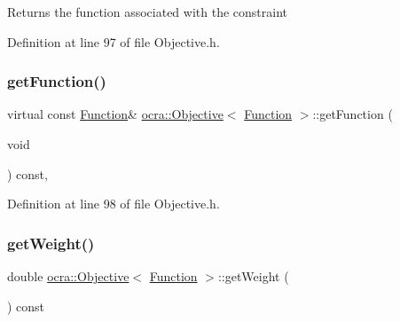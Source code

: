 Returns the function associated with the constraint 

Definition at line 97 of file Objective.\+h.

\hypertarget{classocra_1_1Objective_3_01Function_01_4_a95077951a77304a73e345eb093513da0}{}\label{classocra_1_1Objective_3_01Function_01_4_a95077951a77304a73e345eb093513da0} 
\subsubsection{\texorpdfstring{get\+Function()}{getFunction()}\hspace{0.1cm}{\footnotesize\ttfamily [2/2]}}
{\footnotesize\ttfamily virtual const \hyperlink{classocra_1_1Function}{Function}\& \hyperlink{classocra_1_1Objective}{ocra\+::\+Objective}$<$ \hyperlink{classocra_1_1Function}{Function} $>$\+::get\+Function (\begin{DoxyParamCaption}\item[{void}]{ }\end{DoxyParamCaption}) const\hspace{0.3cm}{\ttfamily [inline]}, {\ttfamily [virtual]}}



Definition at line 98 of file Objective.\+h.

\hypertarget{classocra_1_1Objective_3_01Function_01_4_ac952056842fb2d15b758eb5a0b342a30}{}\label{classocra_1_1Objective_3_01Function_01_4_ac952056842fb2d15b758eb5a0b342a30} 
\subsubsection{\texorpdfstring{get\+Weight()}{getWeight()}}
{\footnotesize\ttfamily double \hyperlink{classocra_1_1Objective}{ocra\+::\+Objective}$<$ \hyperlink{classocra_1_1Function}{Function} $>$\+::get\+Weight (\begin{DoxyParamCaption}{ }\end{DoxyParamCaption}) const\hspace{0.3cm}{\ttfamily [inline]}}



